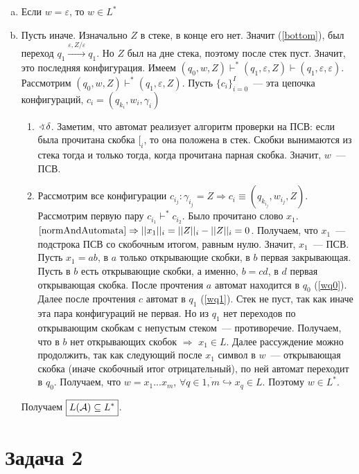 \documentclass[a4paper]{article}
\def\A{{\cal A}}
\begin{document}
\begin{enumerate}
\begin{enumerate}[a.]
\item Если $w=\varepsilon$, то $w\in L^*$
\item Пусть иначе. Изначально $Z$ в стеке, в конце его нет. Значит (\ref{bottom}), был переход $q_1\overset{\varepsilon
,Z/\varepsilon}{\longrightarrow}q_1$. Но $Z$ был на дне стека, поэтому после стек пуст. Значит, это последняя конфигурация. Имеем $(q_0,w,Z)\vdash^*(q_1,\varepsilon,Z)\vdash(q_1,\varepsilon,\varepsilon)$. Рассмотрим $(q_0,w,Z)\vdash^*(q_1,\varepsilon,Z)$. Пусть $\{c_i\}_{i=0}^I$~--- эта цепочка конфигураций, $c_i=(q_{k_i},w_i,\gamma_i)$\begin{enumerate}
\item $\varangle \delta$. Заметим, что автомат реализует алгоритм проверки на ПСВ: если была прочитана скобка $[_i$, то она положена в стек. Скобки вынимаются из стека тогда и только тогда, когда прочитана парная скобка. Значит, $w$~--- ПСВ.
\item Рассмотрим все конфигурации $c_{i_j}\colon \gamma_{i_j}=Z\Rightarrow c_i\equiv (q_{k_{i_j}},w_{i_j},Z)$. Рассмотрим первую пару $c_{i_1}\vdash^*c_{i_{2}}$. Было прочитано слово $x_1$. $\ref{normAndAutomata}\Rightarrow ||x_1||_i=||Z||_i-||Z||_i=0$. Получаем, что  $x_1$~--- подстрока ПСВ со скобочным итогом, равным нулю. Значит, $x_1$~--- ПСВ. Пусть $x_1=ab$, в $a$ только открывающие скобки, в $b$ первая закрывающая. Пусть в $b$ есть открывающие скобки, а именно, $b=cd$, в $d$ первая открывающая скобка. После прочтения $a$ автомат находится в $q_0$ (\ref{wq0}). Далее после прочтения $c$ автомат в $q_1$ (\ref{wq1}). Стек не пуст, так как иначе эта пара конфигураций не первая. Но из $q_1$ нет переходов по открывающим скобкам с непустым стеком~--- противоречие. Получаем, что в $b$ нет открывающих скобок $\Rightarrow$ $x_1\in L$. Далее рассуждение можно продолжить, так как следующий после $x_1$ символ в $w$~--- открывающая скобка (иначе скобочный итог отрицательный), по ней автомат переходит в $q_0$.\newline
Получаем, что $w=x_1...x_m$, $\forall q\in\overline{1,m}\hookrightarrow x_q\in L$. Поэтому $w\in L^*$.
\end{enumerate}
Получаем $\boxed{L(\A)\subseteq L^*}$.
\end{enumerate}
\end{enumerate}
\section*{Задача 2}
\end{document}

